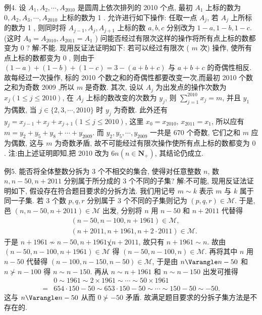 例4. 设 $A_1, A_2, \cdots, A_{2010}$ 是圆周上依次排列的 2010 个点, 最初 $A_1$ 上标的数为 $0, A_2, A_3, \cdots, A_{2010}$ 上标的数为 1 . 允许进行如下操作: 任取一点 $A_j$, 若 $A_j$ 上所标的数为 1 , 则同时将 $A_{j-1}, A_j, A_{j+1}$ 上标的数 $a, b, c$ 分别改为 $1-a, 1-b, 1-c$. (这时 $A_0=A_{2010}, A_{2011}=A_1$ ) 问能否经过有限次这样的操作将所有点上标的数都变为 0 ?
解:不能.
现用反证法证明如下: 若可以经过有限次 ( $m$ 次) 操作, 使所有点上标的数都变为 0 , 则由于 $(1-a)+(1-b)+(1-c)=3-(a+b+c)$ 与 $a+b+c$ 的奇偶性相反.
故每经过一次操作, 标的 2010 个数之和的奇偶性都要改变一次,而最初 2010 个数之和为奇数 2009 ,所以 $m$ 是奇数.
其次, 设以 $A_j$ 为出发点的操作次数为 $x_j(1 \leqslant j \leqslant 2010)$, 在 $A_j$ 上标的数改变的次数为 $y_j$, 则 $\sum_{j=1}^{2010} x_j=m$, 并且 $y_1$ 为偶数, 当 $j \in\{2,3, \cdots, 2010\}$ 时 $y_j$ 为奇数.
此外还有 $y_j=x_{j-1}+x_j+x_{j+1}(1 \leqslant j \leqslant 2010)$, 这里 $x_0=x_{2010}$, $x_{2011}=x_1$, 所以应有 $m=y_2+y_5+y_8+\cdots+y_{2009}$. 而 $y_2, y_5, \cdots, y_{2009}$ 一共是 670 个奇数, 它们之和 $m$ 应为偶数, 这与 $m$ 为奇数矛盾, 故不可能经过有限次操作使所有点上标的数都变为 0 .
注:由上述证明即知,把 2010 改为 $6 n\left(n \in \mathbf{N}_{+}\right)$, 其结论仍成立.



例5. 能否将全体整数分拆为 3 个不相交的集合, 使得对任意整数 $n$, 数 $n, n-50, n+2011$ 分别属于所分成的 3 个不同的子集?
解:不可能, 现用反证法证明如下, 假设存在符合题目要求的分拆方法.
我们用记号 $m \sim k$ 表示 $m$ 与 $k$ 属于同一子集.
若 3 个数 $p, q, r$ 分别属于 3 个不同的子集则记为 $(p, q, r) \in \mathcal{M}$. 于是, 邑 $(n, n-50, n+2011) \in \mathscr{M}$ 出发, 分别将 $n$ 用 $n-50$ 和 $n+2011$ 代替得
$$
\begin{aligned}
& (n-50, n-100, n+1961) \in \mathscr{M}, \\
& (n+2011, n+1961, n+2 \cdot 2011) \in \mathcal{M} .
\end{aligned}
$$
于是 $n+1961 \not \sim n-50, n+1961 \not \chi n+2011$, 故只有 $n+1961 \sim n$. 故由 $(n-50, n-100, n+1961) \in \mathcal{M}$ 得 $(n-50, n-100, n) \in \mathcal{M}$. 再将其中 $n$
用 $n-50$ 代替得 $(n-100, n-150, n-50) \in \mathcal{M}$, 于是由 $n \Varangle n-50$ 和 $n \nsucc n-100$ 得 $n \sim n-150$. 再从 $n \sim n+1961$ 和 $n \sim n-150$ 出发可推得
$$
\begin{aligned}
& 0 \sim 1961 \sim 2 \times 1961 \sim \cdots \sim 50 \times 1961 \\
= & 654 \cdot 150-50 \sim 653 \cdot 150-50 \sim \cdots \sim 150-50 \sim-50 .
\end{aligned}
$$
这与 $n \Varangle n-50$ 从而 $0 \nsucc-50$ 矛盾.
故满足题目要求的分拆子集方法是不存在的.



